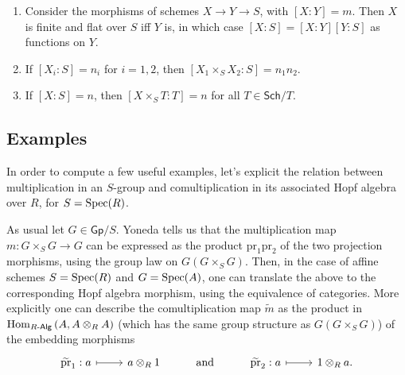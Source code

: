 \begin{prop}\leavevmode\vspace{-.2\baselineskip}
\begin{enumerate}
	\item Consider the morphisms of schemes $X \to Y \to S$, with $[X:Y] = m$.
		Then $X$ is finite and flat over $S$ iff $Y$ is, in which case
		$[X:S] = [X:Y] [Y:S]$ as functions on $Y$.
		
	\item If $[X_i:S] = n_i$ for $i=1,2$, then
		$[X_1 \times_{ S } X_2 : S] = n_1n_2$.

	\item If $[X:S] = n$, then $[X \times_{ S } T : T] = n$
		for all $T \in \mathsf{Sch}/T$.
\end{enumerate}
\end{prop}


\subsection{Examples}
In order to compute a few useful examples, let's explicit the relation between
multiplication in an $S$-group and comultiplication in its associated Hopf algebra over
$R$, for $S = \operatorname{Spec}(R)$.
\begin{rem}\label{rem:ExplicitComult}
	As usual let \(G \in \mathsf{Gp}/S\).
	Yoneda tells us that the multiplication map 
	$m\colon G \times_S G \to G$ can be expressed
	as the product $\mathrm{pr}_1 \mathrm{pr}_2$
	of the two projection morphisms, using the group law
	on $G(G \times_S G)$.
	Then, in the case of affine schemes $S = \operatorname{Spec}(R)$
	and $G = \operatorname{Spec}(A)$, one can translate the above to the corresponding
	Hopf algebra morphism, using the equivalence of categories.
	More explicitly one can describe the comultiplication map
	$\widetilde{m}$ as the product in 
	$\operatorname{Hom}_{R\text{-}\mathsf{Alg}} \left( A, A \otimes_R A \right)$ 
	(which has the same group structure as $G(G \times_S G)$)
	of the embedding morphisms
	\begin{equation*}
	\begin{tikzcd}
		\widetilde{\mathrm{pr}}_1: a \arrow[r, "", mapsto] &
		a \otimes_R 1 &
		\text{and} &
		\widetilde{\mathrm{pr}}_2: a \arrow[r, "", mapsto] &
		1 \otimes_R a
	.\end{tikzcd}
	\end{equation*}
\end{rem}


